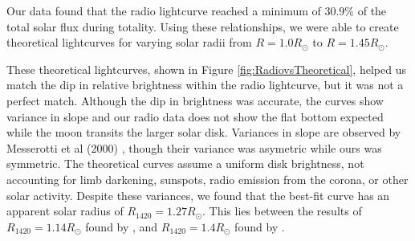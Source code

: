 Our data found that the radio lightcurve reached a minimum of 30.9\% of the total solar flux during totality.
Using these relationships, we were able to create theoretical lightcurves for varying solar radii from $R = 1.0 R_{\odot}$ to $R = 1.45 R_{\odot}$.

These theoretical lightcurves, shown in Figure \ref{fig:RadiovsTheoretical}, helped us match the dip in relative brightness within the radio lightcurve, but it was not a perfect match.
Although the dip in brightness was accurate, the curves show variance in slope and our radio data does not show the flat bottom expected while the moon transits the larger solar disk.
Variances in slope are observed by Messerotti et al (2000) \cite{messerotti_radio_2000}, though their variance was asymetric while ours was symmetric.
The theoretical curves assume a uniform disk brightness, not accounting for limb darkening, sunspots, radio emission from the corona, or other solar activity.
Despite these variances, we found that the best-fit curve has an apparent solar radius of $R_{\mathrm{1420}} = 1.27 R_{\odot}$.
This lies between the results of $R_{\mathrm{1420}} = 1.14 R_{\odot}$ found by \cite{messerotti_radio_2000}, and $R_{\mathrm{1420}} = 1.4 R_{\odot}$ found by \cite{leung_solar_2022}.



